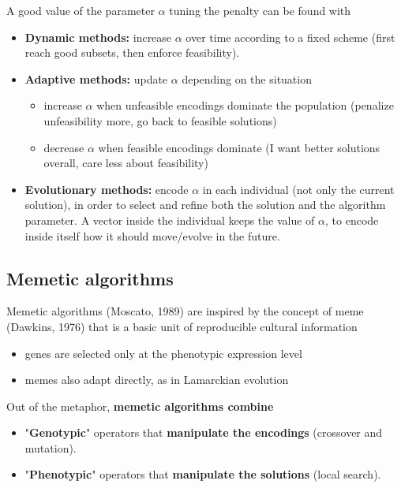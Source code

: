 \documentclass[11pt]{article}
\begin{document}
	A good value of the parameter $\alpha$ tuning the penalty can be found with
	\begin{itemize}
		\item \textbf{Dynamic methods:} increase $\alpha$ over time according to a fixed scheme (first reach good subsets, then enforce feasibility).\\
		
		\item \textbf{Adaptive methods:} update $\alpha$ depending on the situation
		\begin{itemize}
			\item increase $\alpha$ when unfeasible encodings dominate the population (penalize unfeasibility more, go back to feasible solutions)
			\item decrease $\alpha$ when feasible encodings dominate (I want better solutions overall, care less about feasibility)
		\end{itemize}
		\nn
		
		\item \textbf{Evolutionary methods:} encode $\alpha$ in each individual (not only the current solution), in order to select and refine both the solution and the algorithm parameter. A vector inside the individual keeps the value of $\alpha$, to encode inside itself how it should move/evolve in the future.\\
	\end{itemize}
	
	\newpage
	
	\subsection{Memetic algorithms}
	
	Memetic algorithms (Moscato, 1989) are inspired by the concept of meme (Dawkins, 1976) that is a basic unit of reproducible cultural information
	\begin{itemize}
		\item genes are selected only at the phenotypic expression level
		\item memes also adapt directly, as in Lamarckian evolution
	\end{itemize}
	
	Out of the metaphor, \textbf{memetic algorithms combine}
	\begin{itemize}
		\item "\textbf{Genotypic}" operators that \textbf{manipulate the encodings} (crossover and mutation).\\
		
		\item "\textbf{Phenotypic}" operators that \textbf{manipulate the solutions} (local search).\\
	\end{itemize}
	
\end{document}
